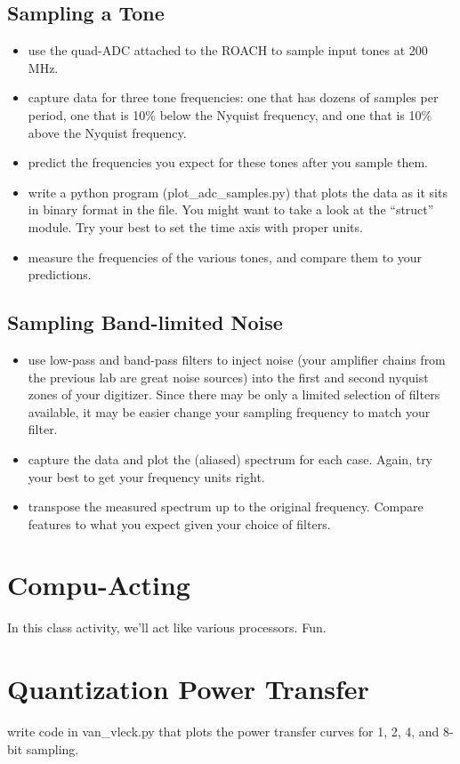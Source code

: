 \documentclass[11pt]{article}
\begin{document}
\subsection{Sampling a Tone}
\begin{itemize}
\item use the quad-ADC attached to the ROACH to sample input tones at 200 MHz.
\item capture data for three tone
frequencies: one that has dozens of samples per period, one that is 10\% below the Nyquist frequency,
and one that is 10\% above the Nyquist frequency.
\item predict the frequencies you expect for these tones after you sample them.
\item write a python program (plot\_adc\_samples.py) that plots the data as it sits in binary format
in the file.  You might want to take a look at the ``struct'' module.  Try your best to set the time
axis with proper units.
\item measure the frequencies of the various tones, and compare them to your predictions.
\end{itemize}

\subsection{Sampling Band-limited Noise}
\begin{itemize}
\item use low-pass and band-pass filters to inject noise (your amplifier chains from the previous
lab are great noise sources) into the first and second nyquist zones of your digitizer.  Since there
may be only a limited selection of filters available, it may be easier change your sampling
frequency to match your filter.
\item capture the data and plot the (aliased) spectrum for each case.  Again, try your best to get your
frequency units right.
\item transpose the measured spectrum up to the original frequency.  Compare features to what you expect
given your choice of filters.
\end{itemize}

\section{Compu-Acting}

In this class activity, we'll act like various processors.  Fun.

\section{Quantization Power Transfer}

\item write code in van\_vleck.py that plots the power transfer curves for 1, 2, 4, and 8-bit sampling.
\end{document}
